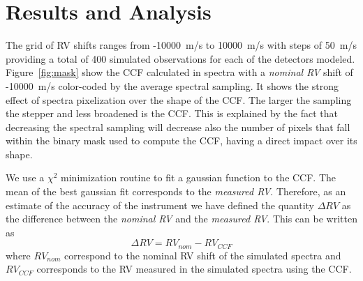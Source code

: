 \documentclass{article}
\begin{document}
\section{Results and Analysis}
The grid of RV shifts ranges from -10000~m/s to 10000~m/s with steps of 50~m/s providing a total of 400 simulated observations for each of the detectors modeled. Figure~\ref{fig:mask} show the CCF calculated in spectra with a \textit{nominal RV} shift of -10000~m/s color-coded by the average spectral sampling. It shows the strong effect of spectra pixelization over the shape of the CCF. The larger the sampling the stepper and less broadened is the CCF. This is explained by the fact that decreasing the spectral sampling will decrease also the number of pixels that fall within the binary mask used to compute the CCF, having a direct impact over its shape. 

We use a $\chi^2$ minimization routine to fit a gaussian function to the CCF. The mean of the best gaussian fit corresponds to the \textit{measured RV}. Therefore, as an estimate of the accuracy of the instrument we have defined the quantity $\Delta RV$ as the difference between the \textit{nominal RV} and the \textit{measured RV}. 
This can be written as 
\begin{equation}
    \Delta RV = RV_{nom} - RV_{CCF}
\end{equation}
where $RV_{nom}$ correspond to the nominal RV shift of the simulated spectra and $RV_{CCF}$ corresponds to the RV measured in the simulated spectra using the CCF. %
\end{document}
